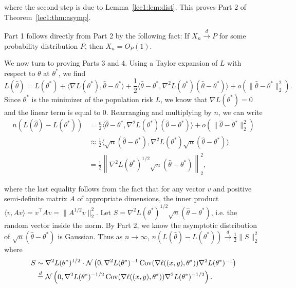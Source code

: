 where the second step is due to Lemma~\ref{lec1:lem:dist}. This proves Part 2 of Theorem~\ref{lec1:thm:asymp}.

Part 1 follows directly from Part 2 by the following fact: If $X_n \stackrel{d}{\rightarrow} P$ for some probability distribution $P$, then $X_n = O_P(1)$.

We now turn to proving Parts 3 and 4. Using a Taylor expansion of $L$ with respect to $\theta$ at $\theta^*$, we find
\begin{equation}
L(\hat \theta) = L(\theta^*) 
+ \langle \nabla L(\theta^*), \hat \theta - \theta^* \rangle 
+ \frac12 \langle \hat \theta - \theta^*, \nabla^2 L(\theta^*) (\hat \theta - \theta^*) \rangle + o(\|\hat \theta - \theta^*\|_2^2).
\end{equation}
Since $\theta^*$ is the minimizer of the population risk $L$, we know that $\nabla L(\theta^*) = 0$ and the linear term is equal to 0. Rearranging and multiplying by $n$, we can write
\begin{align}
n (L(\hat \theta) - L(\theta^*)) &= \frac{n}{2} \langle \hat \theta - \theta^*, \nabla^2 L(\theta^*) (\hat \theta - \theta^*) \rangle + o(\|\hat \theta - \theta^*\|_2^2) \\
&\approx \frac12 \langle \sqrt n(\hat \theta - \theta^*), \nabla^2 L(\theta^*) \sqrt n (\hat \theta - \theta^*) \rangle \\
&= \frac12 \left\|\nabla^2 L(\theta^*)^{1/2} \sqrt n(\hat \theta - \theta^*) \right\|_2^2,
\end{align}

where the last equality follows from the fact that for any vector $v$ and positive semi-definite matrix $A$ of appropriate dimensions, the inner product $\langle v, Av\rangle = v^\top Av = \lVert A^{1/2}v \rVert_2^2$. Let $S = \nabla^2 L(\theta^*)^{1/2} \sqrt n(\hat \theta - \theta^*)$, i.e. the random vector inside the norm. By Part 2, we know the asymptotic distribution of $\sqrt n(\hat \theta - \theta^*)$ is Gaussian. Thus as $n \to \infty$, $n (L(\hat \theta) - L(\theta^*)) \overset d \to \frac12 \|S\|_2^2$ where
\begin{align}
    S &\sim \nabla^2 L(\theta^*)^{1/2} \cdot \mathcal N \left(0, \nabla^2 L(\theta^*)^{-1} \operatorname{Cov}(\nabla \ell ((x, y), \theta^*)) \nabla^2 L(\theta^*)^{-1} \right) \\
    &\stackrel{d}{=} \mathcal N \left(0, \nabla^2 L(\theta^*)^{-1/2} \operatorname{Cov}(\nabla \ell ((x, y), \theta^*)) \nabla^2 L(\theta^*)^{-1/2} \right).
\end{align}

